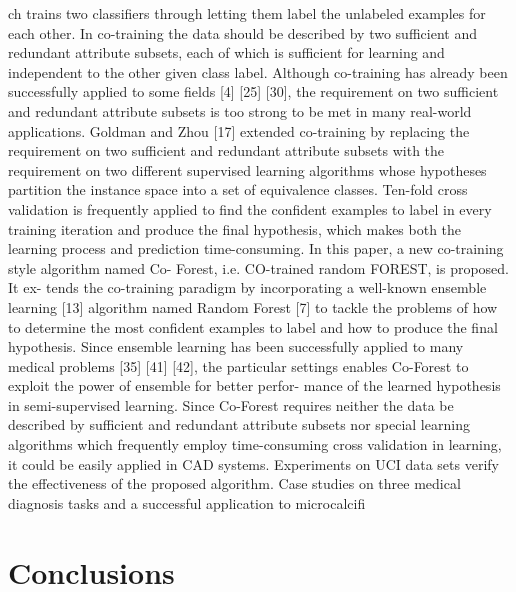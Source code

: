 \documentclass[journal]{IEEEtran}
\begin{document}
ch trains two classifiers through letting them label the unlabeled examples for each other. In co-training the data should be described by two sufficient and redundant attribute subsets, each of which is sufficient for learning and independent to the other given class label.
Although co-training has already been successfully applied to some fields [4] [25] [30], the requirement on two sufficient and redundant attribute subsets is too strong to be met in many real-world applications. Goldman and Zhou [17] extended co-training by replacing the requirement on two sufficient and redundant attribute subsets with the requirement on two different supervised learning algorithms whose hypotheses partition the instance space into a set of equivalence classes. Ten-fold cross validation is frequently applied to find the confident examples to label in every training iteration and produce the final hypothesis, which makes both the learning process and prediction time-consuming.
In this paper, a new co-training style algorithm named Co- Forest, i.e. CO-trained random FOREST, is proposed. It ex- tends the co-training paradigm by incorporating a well-known ensemble learning [13] algorithm named Random Forest [7] to tackle the problems of how to determine the most confident examples to label and how to produce the final hypothesis. Since ensemble learning has been successfully applied to many medical problems [35] [41] [42], the particular settings enables Co-Forest to exploit the power of ensemble for better perfor- mance of the learned hypothesis in semi-supervised learning. Since Co-Forest requires neither the data be described by sufficient and redundant attribute subsets nor special learning algorithms which frequently employ time-consuming cross validation in learning, it could be easily applied in CAD systems. Experiments on UCI data sets verify the effectiveness of the proposed algorithm. Case studies on three medical diagnosis tasks and a successful application to microcalcifi
\section{Conclusions}
\end{document}
